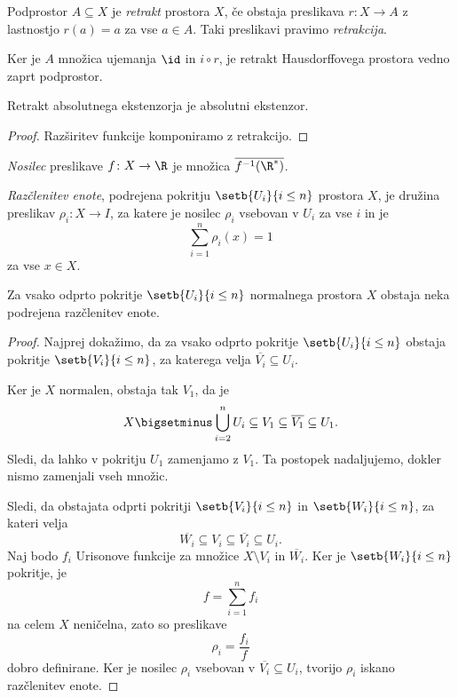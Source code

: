 \begin{definicija}
Podprostor $A \subseteq X$ je
\emph{retrakt} prostora $X$, če
obstaja preslikava $r \colon X \to A$ z lastnostjo $r(a) = a$ za
vse $a \in A$. Taki preslikavi pravimo \emph{retrakcija}.
\end{definicija}

\begin{opomba}
Ker je $A$ množica ujemanja $\id$ in $i \circ r$, je retrakt
Hausdorffovega prostora vedno zaprt podprostor.
\end{opomba}

\begin{trditev}
Retrakt absolutnega ekstenzorja je absolutni ekstenzor.
\end{trditev}

\begin{proof}
Razširitev funkcije komponiramo z retrakcijo.
\end{proof}

\begin{definicija}
\emph{Nosilec} preslikave
$f \colon X \to \R$ je množica $\overline{f^{-1}(\R^*)}$.
\end{definicija}

\begin{definicija}
\emph{Razčlenitev enote}, podrejena pokritju $\setb{U_i}{i \leq n}$
prostora $X$, je družina preslikav $\rho_i \colon X \to I$, za
katere je nosilec $\rho_i$ vsebovan v $U_i$ za vse $i$ in je
\[
\sum_{i=1}^n \rho_i(x) = 1
\]
za vse $x \in X$.
\end{definicija}

\begin{izrek}
Za vsako odprto pokritje $\setb{U_i}{i \leq n}$ normalnega prostora
$X$ obstaja neka podrejena razčlenitev enote.
\end{izrek}

\begin{proof}
Najprej dokažimo, da za vsako odprto pokritje
$\setb{U_i}{i \leq n}$ obstaja pokritje $\setb{V_i}{i \leq n}$, za
katerega velja $\overline{V_i} \subseteq U_i$.

Ker je $X$ normalen, obstaja tak $V_1$, da je
\[
X \bigsetminus \bigcup_{i=2}^n U_i \subseteq V_1 \subseteq
\overline{V_1} \subseteq U_1.
\]
Sledi, da lahko v pokritju $U_1$ zamenjamo z $V_1$. Ta postopek
nadaljujemo, dokler nismo zamenjali vseh množic.

Sledi, da obstajata odprti pokritji $\setb{V_i}{i \leq n}$ in
$\setb{W_i}{i \leq n}$, za kateri velja
\[
\overline{W_i} \subseteq V_i \subseteq
\overline{V_i} \subseteq U_i.
\]
Naj bodo $f_i$ Urisonove funkcije za množice $X \setminus V_i$
in $\overline{W_i}$. Ker je $\setb{W_i}{i \leq n}$ pokritje, je
\[
f = \sum_{i=1}^n f_i
\]
na celem $X$ neničelna, zato so preslikave
\[
\rho_i = \frac{f_i}{f}
\]
dobro definirane. Ker je nosilec $\rho_i$ vsebovan v
$\overline{V_i} \subseteq U_i$, tvorijo $\rho_i$ iskano razčlenitev
enote.
\end{proof}

